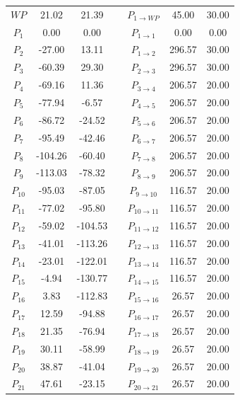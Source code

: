 \begin{itemize}
\begin{longtable}{ccc p{8mm} ccc}
                $WP$ & 21.02 & 21.39 & & $P_{1 \rightarrow WP}$ & 45.00 & 30.00 \\
                $P_{1}$ & 0.00 & 0.00 & & $P_{1 \rightarrow 1}$ & 0.00 & 0.00 \\
                $P_{2}$ & -27.00 & 13.11 & & $P_{1 \rightarrow 2}$ & 296.57 & 30.00 \\
                $P_{3}$ & -60.39 & 29.30 & & $P_{2 \rightarrow 3}$ & 296.57 & 30.00 \\
                $P_{4}$ & -69.16 & 11.36 & & $P_{3 \rightarrow 4}$ & 206.57 & 20.00 \\
                $P_{5}$ & -77.94 & -6.57 & & $P_{4 \rightarrow 5}$ & 206.57 & 20.00 \\
                $P_{6}$ & -86.72 & -24.52 & & $P_{5 \rightarrow 6}$ & 206.57 & 20.00 \\
                $P_{7}$ & -95.49 & -42.46 & & $P_{6 \rightarrow 7}$ & 206.57 & 20.00 \\
                $P_{8}$ & -104.26 & -60.40 & & $P_{7 \rightarrow 8}$ & 206.57 & 20.00 \\
                $P_{9}$ & -113.03 & -78.32 & & $P_{8 \rightarrow 9}$ & 206.57 & 20.00 \\
                $P_{10}$ & -95.03 & -87.05 & & $P_{9 \rightarrow 10}$ & 116.57 & 20.00 \\
                $P_{11}$ & -77.02 & -95.80 & & $P_{10 \rightarrow 11}$ & 116.57 & 20.00 \\
                $P_{12}$ & -59.02 & -104.53 & & $P_{11 \rightarrow 12}$ & 116.57 & 20.00 \\
                $P_{13}$ & -41.01 & -113.26 & & $P_{12 \rightarrow 13}$ & 116.57 & 20.00 \\
                $P_{14}$ & -23.01 & -122.01 & & $P_{13 \rightarrow 14}$ & 116.57 & 20.00 \\
                $P_{15}$ & -4.94 & -130.77 & & $P_{14 \rightarrow 15}$ & 116.57 & 20.00 \\
                $P_{16}$ & 3.83 & -112.83 & & $P_{15 \rightarrow 16}$ & 26.57 & 20.00 \\
                $P_{17}$ & 12.59 & -94.88 & & $P_{16 \rightarrow 17}$ & 26.57 & 20.00 \\
                $P_{18}$ & 21.35 & -76.94 & & $P_{17 \rightarrow 18}$ & 26.57 & 20.00 \\
                $P_{19}$ & 30.11 & -58.99 & & $P_{18 \rightarrow 19}$ & 26.57 & 20.00 \\
                $P_{20}$ & 38.87 & -41.04 & & $P_{19 \rightarrow 20}$ & 26.57 & 20.00 \\
                $P_{21}$ & 47.61 & -23.15 & & $P_{20 \rightarrow 21}$ & 26.57 & 20.00 \\


\end{longtable}
\end{itemize}
